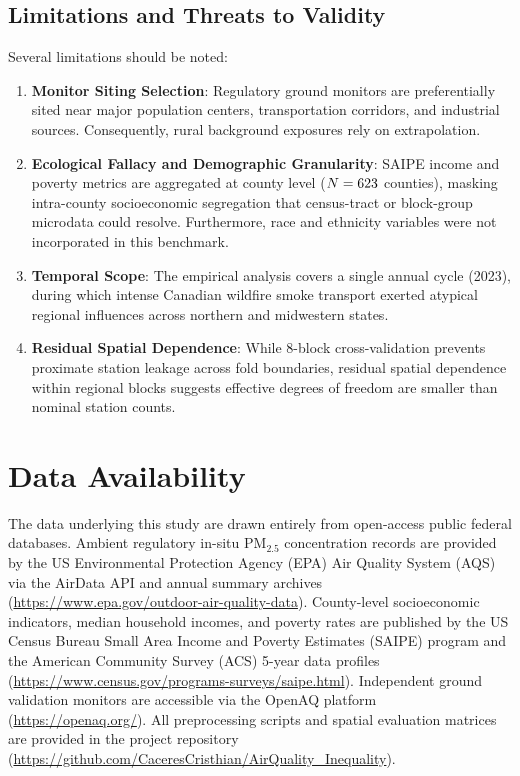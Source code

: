 \documentclass[conference]{IEEEtran}
\begin{document}
\subsection{Limitations and Threats to Validity}
Several limitations should be noted:
\begin{enumerate}
    \item \textbf{Monitor Siting Selection}: Regulatory ground monitors are preferentially sited near major population centers, transportation corridors, and industrial sources. Consequently, rural background exposures rely on extrapolation.
    \item \textbf{Ecological Fallacy and Demographic Granularity}: SAIPE income and poverty metrics are aggregated at county level ($N=623{}$ counties), masking intra-county socioeconomic segregation that census-tract or block-group microdata could resolve. Furthermore, race and ethnicity variables were not incorporated in this benchmark.
    \item \textbf{Temporal Scope}: The empirical analysis covers a single annual cycle (2023), during which intense Canadian wildfire smoke transport exerted atypical regional influences across northern and midwestern states.
    \item \textbf{Residual Spatial Dependence}: While 8-block cross-validation prevents proximate station leakage across fold boundaries, residual spatial dependence within regional blocks suggests effective degrees of freedom are smaller than nominal station counts.
\end{enumerate}

\section{Data Availability}
\label{sec:data_availability}
The data underlying this study are drawn entirely from open-access public federal databases. Ambient regulatory in-situ $\mathrm{PM}_{2.5}$ concentration records are provided by the US Environmental Protection Agency (EPA) Air Quality System (AQS) via the AirData API and annual summary archives (\url{https://www.epa.gov/outdoor-air-quality-data}). County-level socioeconomic indicators, median household incomes, and poverty rates are published by the US Census Bureau Small Area Income and Poverty Estimates (SAIPE) program and the American Community Survey (ACS) 5-year data profiles (\url{https://www.census.gov/programs-surveys/saipe.html}). Independent ground validation monitors are accessible via the OpenAQ platform (\url{https://openaq.org/}). All preprocessing scripts and spatial evaluation matrices are provided in the project repository (\url{https://github.com/CaceresCristhian/AirQuality_Inequality}).
\end{document}
